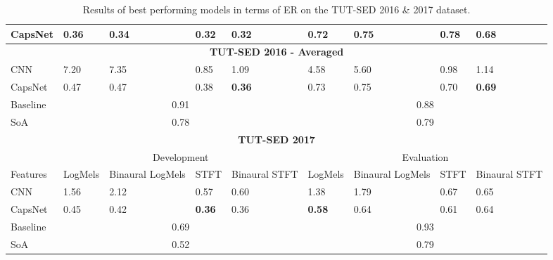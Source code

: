 \begin{table}[h]
{\begin{tabular}{@{}lllllllll@{}}
			CapsNet       & 0.36      & 0.34               & 0.32 & \multicolumn{1}{l|}{\textbf{0.32}}        & 0.72      & 0.75               & 0.78 &\textbf{0.68}        \\ \midrule
			\midrule
			\multicolumn{9}{c}{\textbf{TUT-SED 2016 - Averaged}}                                                                                         \\ \midrule
			CNN     & 7.20      & 7.35               & 0.85 & \multicolumn{1}{l|}{1.09}        & 4.58      & 5.60               & 0.98 & 1.14       \\
			CapsNet & 0.47      & 0.47               & 0.38 & \multicolumn{1}{l|}{\textbf{0.36}}        & 0.73      & 0.75               & 0.70 & \textbf{0.69}       \\
			\midrule
			Baseline \cite{mesaros2016tut}      & \multicolumn{4}{c|}{0.91}                                                & \multicolumn{4}{c}{0.88}                            \\
			SoA \cite{valenti2017neural}          & \multicolumn{4}{c|}{0.78}                                                & \multicolumn{4}{c}{0.79}                            \\ \bottomrule
			\toprule
			\multicolumn{9}{c}{\textbf{TUT-SED 2017}}                                                                                                                                  \\ \midrule
			& \multicolumn{4}{c|}{Development}                                                          & \multicolumn{4}{c}{Evaluation}                                      \\ \midrule
			Features & LogMels & Binaural  LogMels & STFT & \multicolumn{1}{l|}{Binaural STFT} & LogMels & Binaural LogMels & STFT & Binaural STFT \\ \midrule
			CNN      & 1.56             & 2.12                       & 0.57 & \multicolumn{1}{l|}{0.60}          & 1.38             & 1.79                      & 0.67 & 0.65        \\
			CapsNet  & 0.45             & 0.42                       & \textbf{0.36} & \multicolumn{1}{l|}{0.36} &\textbf{0.58}            & 0.64                      & 0.61 & 0.64 \\ 
			\midrule
			Baseline \cite{DCASE2017challenge} & \multicolumn{4}{c|}{0.69}							& \multicolumn{4}{c}{0.93} \\
			SoA \cite{adavanne2017report}     & \multicolumn{4}{c|}{0.52}             				& \multicolumn{4}{c}{0.79}  \\ \bottomrule
		\end{tabular}
	}
	\caption[Polyphonic SED with CapsNets - Results]{Results of best performing models in terms of ER on the TUT-SED 2016 \& 2017 dataset.}		
	\label{tbl:results-dcase2016}
\end{table}


